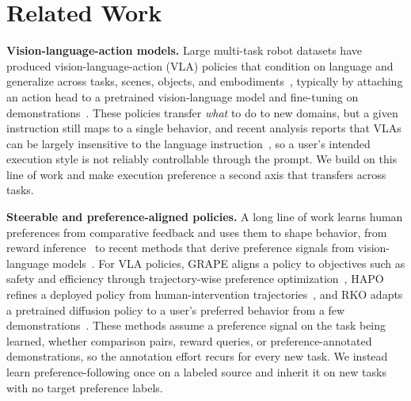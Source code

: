 \documentclass{article}
\begin{document}
\section{Related Work}
\label{sec:related}



\textbf{Vision-language-action models.}
Large multi-task robot datasets have produced vision-language-action (VLA) policies that condition on language and generalize across tasks, scenes, objects, and embodiments~\citep{o2024open, kim2024openvla, black2024pi0}, typically by attaching an action head to a pretrained vision-language model and fine-tuning on demonstrations~\citep{kim2024openvla, kim2025oft}.
These policies transfer \emph{what} to do to new domains, but a given instruction still maps to a single behavior, and recent analysis reports that VLAs can be largely insensitive to the language instruction~\citep{liberoplus}, so a user's intended execution style is not reliably controllable through the prompt.
We build on this line of work and make execution preference a second axis that transfers across tasks.

\textbf{Steerable and preference-aligned policies.}
A long line of work learns human preferences from comparative feedback and uses them to shape behavior, from reward inference~\citep{Frnkranz2010PreferenceLA, Sadigh2017ActivePL, Peng2025UUPL} to recent methods that derive preference signals from vision-language models~\citep{ghosh2025prefvlm, singh2025varp}.
For VLA policies, GRAPE aligns a policy to objectives such as safety and efficiency through trajectory-wise preference optimization~\citep{zhang2024grape}, HAPO refines a deployed policy from human-intervention trajectories~\citep{xia2025hapo}, and RKO adapts a pretrained diffusion policy to a user's preferred behavior from a few demonstrations~\citep{moletta2026rko}.
These methods assume a preference signal on the task being learned, whether comparison pairs, reward queries, or preference-annotated demonstrations, so the annotation effort recurs for every new task.
We instead learn preference-following once on a labeled source and inherit it on new tasks with no target preference labels.
\end{document}
